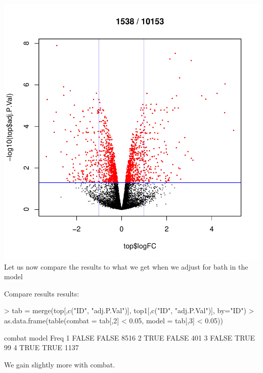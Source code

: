 \documentclass{article}
\begin{document}
\includegraphics{example-010}
Let us now compare the results to what we get when we adjust for bath in the model

\begin{Schunk}
\end{Schunk}
Compare results results:
\begin{Schunk}
\begin{Sinput}
> tab = merge(top[,c("ID", "adj.P.Val")], top1[,c("ID", "adj.P.Val")], by="ID")
> as.data.frame(table(combat = tab[,2] < 0.05, model = tab[,3] < 0.05))
\end{Sinput}
\begin{Soutput}
  combat model Freq
1  FALSE FALSE 8516
2   TRUE FALSE  401
3  FALSE  TRUE   99
4   TRUE  TRUE 1137
\end{Soutput}
\end{Schunk}
We gain slightly more with combat.
\end{document}
